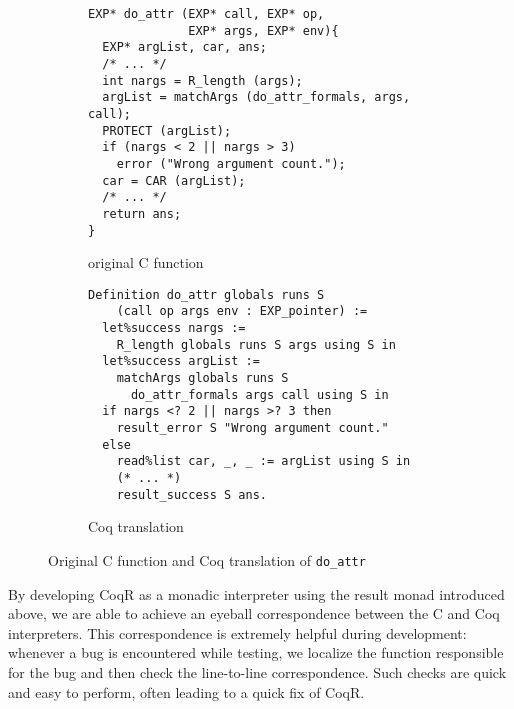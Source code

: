 \documentclass[
    sigplan,
    10pt,
    review, %
    natbib=false %
 ]{acmart}
\newcommand\et[1]{\todo[color=blue!20,size=\scriptsize]{#1}}
\newcommand\CoqR{CoqR}
\begin{document}
\begin{figure*}[t]
    \centering{}
\begin{subfigure}{.54\textwidth}
\begin{verbatim}
EXP* do_attr (EXP* call, EXP* op,
              EXP* args, EXP* env){
  EXP* argList, car, ans;
  /* ... */
  int nargs = R_length (args);
  argList = matchArgs (do_attr_formals, args, call);
  PROTECT (argList);
  if (nargs < 2 || nargs > 3)
    error ("Wrong argument count.");
  car = CAR (argList);
  /* ... */
  return ans;
}
\end{verbatim}
    \caption{original C function}
    \label{fig:c:do_attr}
\end{subfigure}
\begin{subfigure}{.45\textwidth}
\begin{verbatim}
Definition do_attr globals runs S
    (call op args env : EXP_pointer) :=
  let%success nargs :=
    R_length globals runs S args using S in
  let%success argList :=
    matchArgs globals runs S
      do_attr_formals args call using S in
  if nargs <? 2 || nargs >? 3 then
    result_error S "Wrong argument count."
  else
    read%list car, _, _ := argList using S in
    (* ... *)
    result_success S ans.
\end{verbatim}
    \caption{Coq translation}
    \label{fig:coq:do_attr}
\end{subfigure}
    \caption{Original C function and Coq translation of \texttt{do_attr}}
    \label{fig:do_attr}
\end{figure*}



By developing \CoqR{} as a monadic interpreter using the result monad introduced above, we are able to achieve an eyeball correspondence between the C and Coq interpreters. This correspondence is extremely helpful during development:
whenever a bug is encountered while testing, we localize the function responsible for the bug and then check the line-to-line correspondence.
Such checks are quick and easy to perform, often leading to a quick fix of \CoqR{}.
%
\end{document}
